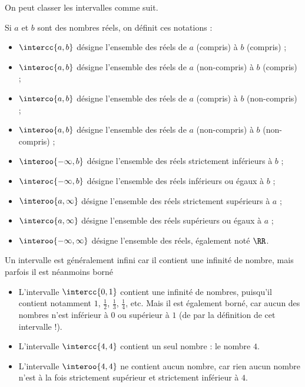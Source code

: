 \begin{frame}
  On peut classer les intervalles comme suit.
  \begin{property}
    Si \(a\) et \(b\) sont des nombres réels, on définit ces notations :
    \begin{itemize}
    \item $\intercc{a,b}$ désigne l'ensemble des réels de $a$ (compris) à $b$ (compris) ;
    \item $\interoc{a,b}$ désigne l'ensemble des réels de $a$ (non-compris) à $b$ (compris) ;
    \item $\interco{a,b}$ désigne l'ensemble des réels de $a$ (compris) à $b$ (non-compris) ;
    \item $\interoo{a,b}$ désigne l'ensemble des réels de $a$ (non-compris) à $b$ (non-compris) ;
    \item \(\interoo{-\infty,b}\) désigne l'ensemble des réels strictement inférieurs à \(b\) ;
    \item \(\interoc{-\infty,b}\) désigne l'ensemble des réels inférieurs ou égaux à \(b\) ;
    \item \(\interoo{a,\infty}\) désigne l'ensemble des réels strictement supérieurs à \(a\) ;
    \item \(\interco{a,\infty}\) désigne l'ensemble des réels supérieurs ou égaux à \(a\) ;
    \item \(\interoo{-\infty,\infty}\) désigne l'ensemble des réels, également noté \(\RR\).
    \end{itemize}
  \end{property}
\end{frame}


\begin{frame}
  Un intervalle est généralement \og infini\fg{} car il contient une infinité de nombre, mais parfois il est néanmoins \og borné\fg{}

  \begin{example}
    \begin{itemize}
    \item L'intervalle \(\intercc{0,1}\) contient une infinité de nombres, puisqu'il contient notamment \(1\), \(\frac{1}{2}\), \(\frac{1}{3}\), \(\frac{1}{4}\), etc. Mais il est également borné, car aucun des nombres n'est inférieur à \(0\) ou supérieur à \(1\) (de par la définition de cet intervalle !).
    \item L'intervalle \(\intercc{4,4}\) contient un seul nombre : le nombre \(4\).
    \item L'intervalle \(\interoo{4,4}\) ne contient aucun nombre, car rien aucun nombre n'est à la fois strictement supérieur et strictement inférieur à \(4\).
    \end{itemize}
  \end{example}
\end{frame}

